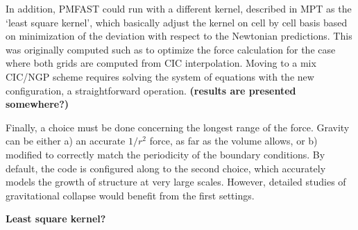 In addition, {\small PMFAST} could run with a different kernel, described in MPT as the `least square kernel', 
which basically adjust the kernel on cell by cell basis based on minimization of the deviation with respect
to the Newtonian predictions. This was originally computed such as to optimize the force calculation for
the case where both grids are computed from CIC interpolation. Moving to a mix CIC/NGP scheme
requires solving the system of equations with the new configuration, a straightforward operation. 
{\bf (results are presented somewhere?)}

Finally, a choice must be done concerning the longest range of the force. Gravity can be either a) an accurate $1/r^2$ force, as far as the volume allows, 
or b) modified to correctly match the periodicity of the boundary conditions. By default, the code is configured along to the second choice,
which accurately models the growth of structure at very large scales. However, detailed studies of gravitational collapse would benefit 
from the first settings.

{\bf Least square kernel?}

